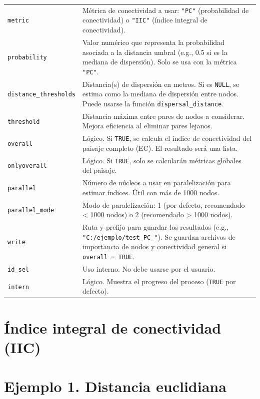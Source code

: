 \documentclass[
]{book}
\begin{document}
\begin{longtable}[]{@{}
  >{\raggedright\arraybackslash}p{}
  >{\raggedright\arraybackslash}p{}@{}}
\texttt{metric} & Métrica de conectividad a usar: \texttt{"PC"} (probabilidad de conectividad) o \texttt{"IIC"} (índice integral de conectividad). \\
\texttt{probability} & Valor numérico que representa la probabilidad asociada a la distancia umbral (e.g., 0.5 si es la mediana de dispersión). Solo se usa con la métrica \texttt{"PC"}. \\
\texttt{distance\_thresholds} & Distancia(s) de dispersión en metros. Si es \texttt{NULL}, se estima como la mediana de dispersión entre nodos. Puede usarse la función \texttt{dispersal\_distance}. \\
\texttt{threshold} & Distancia máxima entre pares de nodos a considerar. Mejora eficiencia al eliminar pares lejanos. \\
\texttt{overall} & Lógico. Si \texttt{TRUE}, se calcula el índice de conectividad del paisaje completo (EC). El resultado será una lista. \\
\texttt{onlyoverall} & Lógico. Si \texttt{TRUE}, solo se calcularán métricas globales del paisaje. \\
\texttt{parallel} & Número de núcleos a usar en paralelización para estimar índices. Útil con más de 1000 nodos. \\
\texttt{parallel\_mode} & Modo de paralelización: 1 (por defecto, recomendado \textless{} 1000 nodos) o 2 (recomendado \textgreater{} 1000 nodos). \\
\texttt{write} & Ruta y prefijo para guardar los resultados (e.g., \texttt{"C:/ejemplo/test\_PC\_"}). Se guardan archivos de importancia de nodos y conectividad general si \texttt{overall\ =\ TRUE}. \\
\texttt{id\_sel} & Uso interno. No debe usarse por el usuario. \\
\texttt{intern} & Lógico. Muestra el progreso del proceso (\texttt{TRUE} por defecto). \\
\end{longtable}

\section{Índice integral de conectividad (IIC)}\label{uxedndice-integral-de-conectividad-iic}

\section{Ejemplo 1. Distancia euclidiana}\label{ejemplo-1.-distancia-euclidiana}
\end{document}
